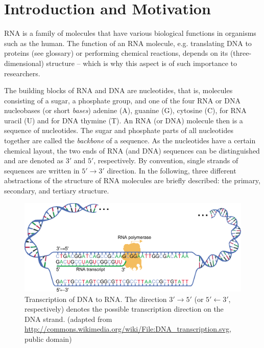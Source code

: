 \documentclass[
    a4paper,
    12pt,
    twoside,
    BCOR=12mm,
    parskip=half,
    chapterprefix,
    numbers=noenddot,
    bibliography=totoc
]{scrbook}
\begin{document}
\section{Introduction and Motivation}
\label{sec:rnaintro}

\Gls{RNA} is a family of molecules that have various biological functions in organisms such as the human. The function of an \gls{RNA} molecule, e.g. translating \gls{DNA} to proteins (see glossary) or performing chemical reactions, depends on its (three-dimensional) structure -- which is why this aspect is of such importance to researchers.

The building blocks of \gls{RNA} and \gls{DNA} are nucleotides, that is, molecules consisting of a sugar, a phosphate group, and one of the four RNA or DNA nucleobases (or short \emph{bases}) adenine (A), guanine (G), cytosine (C), for RNA uracil (U) and for DNA thymine (T). An \gls{RNA} (or \gls{DNA}) molecule then is a sequence of nucleotides. The sugar and phosphate parts of all nucleotides together are called the \emph{backbone} of a sequence. As the nucleotides have a certain chemical layout, the two ends of \gls{RNA} (and \gls{DNA}) sequences can be distinguished and are denoted as $3'$ and $5'$, respectively. By convention, single strands of sequences are written in $5' \to 3'$ direction. In the following, three different abstractions of the structure of \gls{RNA} molecules are briefly described: the primary, secondary, and tertiary structure.

\begin{figure}
	\centering
		\includegraphics[width=1.00\textwidth]{imgs/dna_transcription.pdf}
	\caption[Transcription of DNA to RNA]{Transcription of DNA to RNA. The direction $3' \to 5'$ (or $5' \leftarrow 3'$, respectively) denotes the possible transcription direction on the \gls{DNA} strand. (adapted from \url{http://commons.wikimedia.org/wiki/File:DNA_transcription.svg}, public domain)}
	\label{fig:transcription}
\end{figure}
\end{document}
